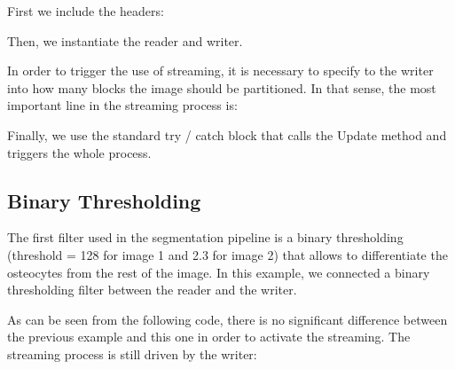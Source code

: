 \documentclass{InsightArticle}
\begin{document}
First we include the headers:

\begin{center}

\end{center}

Then, we instantiate the reader and writer.

\begin{center}

\end{center}

In order to trigger the use of streaming, it is necessary to specify to the
writer into how many blocks the image should be partitioned. In that sense, the
most important line in the streaming process is:

\begin{center}

\end{center}

Finally, we use the standard try / catch block that calls the Update method and
triggers the whole process.

\begin{center}

\end{center}

\subsection{Binary Thresholding}
The first filter used in the segmentation pipeline is a binary thresholding
(threshold = 128 for image 1 and 2.3 for image 2) that
allows to differentiate the osteocytes from the rest of the image. In this example,
we connected a binary thresholding filter between the reader and the writer.

\begin{center}

\end{center}

As can be seen from the following code, there is no significant difference
between the previous example and this one in order to activate the streaming.
The streaming process is still driven by the writer:

\begin{center}

\end{center}
\end{document}
